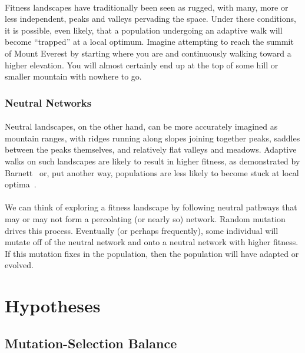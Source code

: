 \documentclass[12pt,letterpaper,titlepage,draft]{article}
\begin{document}
\paragraph{}
Fitness landscapes have traditionally been seen as rugged, with many, more or
less independent, peaks and valleys pervading the space. Under these
conditions, it is possible, even likely, that a population undergoing an
adaptive walk will become ``trapped'' at a local optimum. Imagine attempting to
reach the summit of Mount Everest by starting where you are and continuously
walking toward a higher elevation. You will almost certainly end up at the top
of some hill or smaller mountain with nowhere to go.

\subsubsection{Neutral Networks}

\paragraph{}
Neutral landscapes, on the other hand, can be more accurately imagined as
mountain ranges, with ridges running along slopes joining together peaks,
saddles between the peaks themselves, and relatively flat valleys and meadows.
Adaptive walks on such landscapes are likely to result in higher fitness, as
demonstrated by Barnett~\cite{Barnett1998} or, put another way, populations are
less likely to become stuck at local optima~\cite{Newman1998}.

\paragraph{}
We can think of exploring a fitness landscape by following neutral pathways
that may or may not form a percolating (or nearly so) network. Random mutation
drives this process. Eventually (or perhaps frequently), some individual will
mutate off of the neutral network and onto a neutral network with higher
fitness. If this mutation fixes in the population, then the population will
have adapted or evolved.

\section{Hypotheses}

\subsection{Mutation-Selection Balance}
\end{document}
